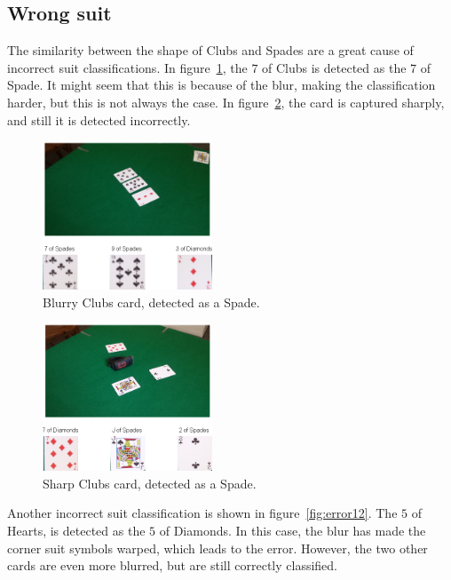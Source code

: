 \documentclass[journal,twoside]{IEEEtran}
\begin{document}
\subsection{Wrong suit}

The similarity between the shape of Clubs and Spades are a great cause of incorrect suit classifications. In figure~\ref{fig:error5}, the $7$ of Clubs is detected as the $7$ of Spade. It might seem that this is because of the blur, making the classification harder, but this is not always the case. In figure~\ref{fig:error3}, the card is captured sharply, and still it is detected incorrectly.

\begin{figure}[placement h]
\centering
\includegraphics[width=0.45\textwidth]{images/testResults/5.png}
\caption{Blurry Clubs card, detected as a Spade.}
\label{fig:error5}
\end{figure}

\begin{figure}[placement h]
\centering
\includegraphics[width=0.45\textwidth]{images/testResults/3.png}
\caption{Sharp Clubs card, detected as a Spade.}
\label{fig:error3}
\end{figure}

Another incorrect suit classification is shown in figure~\ref{fig:error12}. The $5$ of Hearts, is detected as the $5$ of Diamonds. In this case, the blur has made the corner suit symbols warped, which leads to the error. However, the two other cards are even more blurred, but are still correctly classified.
\end{document}
